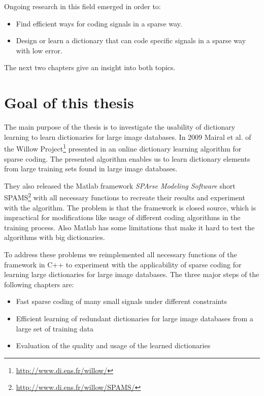 Ongoing research in this field emerged in order to:
\begin{itemize}
 \item Find efficient ways for coding signals in a sparse way.
 \item Design or learn a dictionary that can code specific signals in
a sparse way with low error.
\end{itemize}
The next two chapters give an insight into both topics. 



\section{Goal of this thesis}
The main purpose of the thesis is to investigate the usability of dictionary
learning to learn dictionaries for large image databases. 
In 2009 Mairal et al. of the Willow
Project\footnote{\url{http://www.di.ens.fr/willow/}} presented in
\cite{Mairal2009,Mairal2010} an online dictionary learning algorithm for sparse
coding. The presented algorithm enables us to learn dictionary elements from
large training sets found in large image databases.

They also released the Matlab framework \emph{SPArse Modeling Software}
short SPAMS\footnote{\url{http://www.di.ens.fr/willow/SPAMS/}} with all
necessary functions to recreate their results and experiment with the algorithm.
The problem is that the framework is closed source, which is impractical for
modifications like usage of different coding algorithms in the training process.
Also Matlab has some limitations that make it hard to test the algorithms with
big dictionaries.

To address these problems we reimplemented all necessary functions of the
framework in C++ to experiment with the applicability of sparse coding for
learning large dictionaries for large image databases. The three major steps of
the following chapters are:

\begin{itemize}
 \item Fast sparse coding of many small signals under different constraints
 \item Efficient learning of redundant dictionaries for large image databases
from a large set of training data
 \item Evaluation of the quality and usage of the learned dictionaries
\end{itemize}

